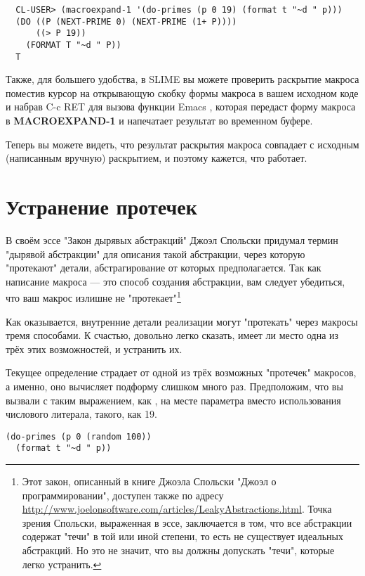 \begin{verbatim}
  CL-USER> (macroexpand-1 '(do-primes (p 0 19) (format t "~d " p)))
  (DO ((P (NEXT-PRIME 0) (NEXT-PRIME (1+ P))))
      ((> P 19))
    (FORMAT T "~d " P))
  T
\end{verbatim}

Также, для большего удобства, в SLIME вы можете проверить раскрытие макроса поместив
курсор на открывающую скобку формы макроса в вашем исходном коде и набрав C-c RET для
вызова функции Emacs , которая передаст форму макроса в
\textbf{MACROEXPAND-1} и напечатает результат во временном буфере.

Теперь вы можете видеть, что результат раскрытия макроса совпадает с исходным (написанным
вручную) раскрытием, и поэтому кажется, что  работает.

\section{Устранение протечек}

В своём эссе "Закон дырявых абстракций" Джоэл Спольски придумал термин "дырявой
абстракции" для описания такой абстракции, через которую "протекают" детали,
абстрагирование от которых предполагается. Так как написание макроса --- это способ
создания абстракции, вам следует убедиться, что ваш макрос излишне не
"протекает"\footnote{Этот закон, описанный в книге Джоэла Спольски "Джоэл о
  программировании", доступен также по адресу
  \url{http://www.joelonsoftware.com/articles/LeakyAbstractions.html}. Точка зрения
  Спольски, выраженная в эссе, заключается в том, что все абстракции содержат "течи" в той
  или иной степени, то есть не существует идеальных абстракций. Но это не значит, что вы
  должны допускать "течи", которые легко устранить.}

Как оказывается, внутренние детали реализации могут "протекать" через макросы тремя
способами. К счастью, довольно легко сказать, имеет ли место одна из трёх этих
возможностей, и устранить их.

Текущее определение страдает от одной из трёх возможных "протечек" макросов, а именно, оно
вычисляет подформу  слишком много раз. Предположим, что вы вызвали
 с таким выражением, как , на месте параметра
 вместо использования числового литерала, такого, как 19.

\begin{lstlisting}
(do-primes (p 0 (random 100))
  (format t "~d " p))
\end{lstlisting}

